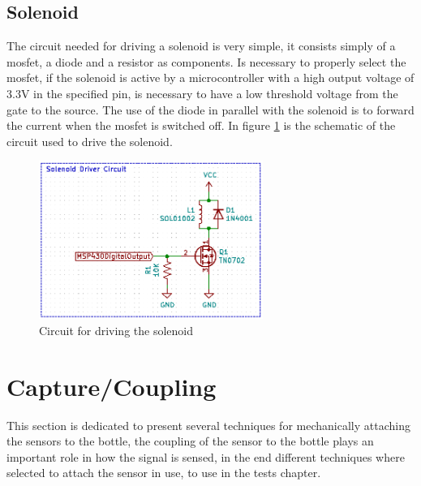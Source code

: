 \subsection{Solenoid}
The circuit needed for driving a solenoid is very simple, it consists simply of a \acrshort{mosfet}, a diode and a resistor as components. Is necessary to properly select the \acrshort{mosfet}, if the solenoid is active by a microcontroller with a high output voltage of 3.3V in the specified pin, is necessary to have a low threshold voltage from the gate to the source. The use of the diode in parallel with the solenoid is to forward the current when the \acrshort{mosfet} is switched off. In figure \ref{fig:solenoidshc} is the schematic of the circuit used to drive the solenoid.
\begin{figure}[]
    \centering
    \includegraphics[width=0.65\textwidth]{Chapters/4CHP/Figures/SolenoidDriver.PNG}
    \caption{Circuit for driving the solenoid}
    \label{fig:solenoidshc}
\end{figure}
\section{Capture/Coupling}\label{sec:CaptureCoupling}
This section is dedicated to present several techniques for mechanically attaching the sensors to the bottle, the coupling of the sensor to the bottle plays an important role in how the signal is sensed, in the end different techniques where selected to attach the sensor in use, to use in the tests chapter.
